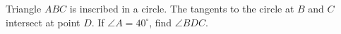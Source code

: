Triangle $ABC$ is inscribed in a circle. The tangents to the circle at $B$ and $C$ intersect at point $D$. If $\angle A=40^\circ$, find $\angle BDC$.

